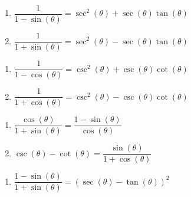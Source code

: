 \begin{multicols}{2}

\begin{enumerate}

\setcounter{enumi}{\value{HW}}

\item  $\dfrac{1}{1-\sin(\theta)} = \sec^{2}(\theta) + \sec(\theta) \tan(\theta)$
\item  $\dfrac{1}{1+\sin(\theta)} = \sec^{2}(\theta) - \sec(\theta) \tan(\theta)$

\setcounter{HW}{\value{enumi}}

\end{enumerate}

\end{multicols}

\begin{multicols}{2}

\begin{enumerate}

\setcounter{enumi}{\value{HW}}

\item  $\dfrac{1}{1-\cos(\theta)} = \csc^{2}(\theta) + \csc(\theta) \cot(\theta)$
\item  $\dfrac{1}{1+\cos(\theta)} = \csc^{2}(\theta) - \csc(\theta) \cot(\theta)$

\setcounter{HW}{\value{enumi}}

\end{enumerate}

\end{multicols}

\begin{multicols}{2}

\begin{enumerate}

\setcounter{enumi}{\value{HW}}

\item $\dfrac{\cos(\theta)}{1 + \sin(\theta)} = \dfrac{1-\sin(\theta)}{\cos(\theta)}$
\item $\csc(\theta) - \cot(\theta) = \dfrac{\sin(\theta)}{1 + \cos(\theta)}$

\setcounter{HW}{\value{enumi}}

\end{enumerate}

\end{multicols}

\begin{multicols}{2}

\begin{enumerate}

\setcounter{enumi}{\value{HW}}

\item $\dfrac{1 - \sin(\theta)}{1 + \sin(\theta)} = (\sec(\theta) - \tan(\theta))^{2}$ \label{lastcirciden}

\setcounter{HW}{\value{enumi}}

\end{enumerate}

\end{multicols}

